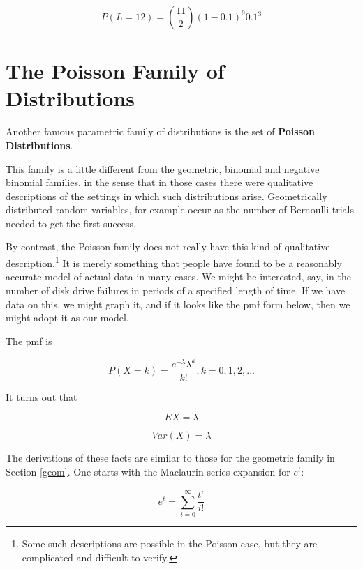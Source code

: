 \begin{equation}
P(L = 12) = \binom{11}{2} (1-0.1)^9 0.1^3
\end{equation}


\section{The Poisson Family of Distributions}
\label{poisfam}

Another famous parametric family of distributions is the set of {\bf
Poisson Distributions}.  

This family is a little different from the geometric, binomial and
negative binomial families, in the sense that in those cases there were
qualitative descriptions of the settings in which such distributions
arise.  Geometrically distributed random variables, for example occur as
the number of Bernoulli trials needed to get the first success.

By contrast, the Poisson family does not really have this kind of
qualitative description.\footnote{Some such descriptions are possible in
the Poisson case, but they are complicated and difficult to verify.} It
is merely something that people have found to be a reasonably accurate
model of actual data in many cases.  We might be interested, say, in the
number of disk drive failures in periods of a specified length of time.
If we have data on this, we might graph it, and if it looks like the pmf
form below, then we might adopt it as our model.

The pmf is

\begin{equation}
\label{poispmf}
P(X = k) = \frac{e^{- \lambda} \lambda^k}{k!}, k = 0,1,2,...
\end{equation}

It turns out that

\begin{equation}
EX = \lambda
\end{equation}

\begin{equation}
Var(X) = \lambda
\end{equation}

The derivations of these facts are similar to those for the geometric
family in Section \ref{geom}.  One starts with the Maclaurin series
expansion for $e^t$:

\begin{equation}
e^t = \sum_{i=0}^{\infty} \frac{t^i}{i!}
\end{equation}

